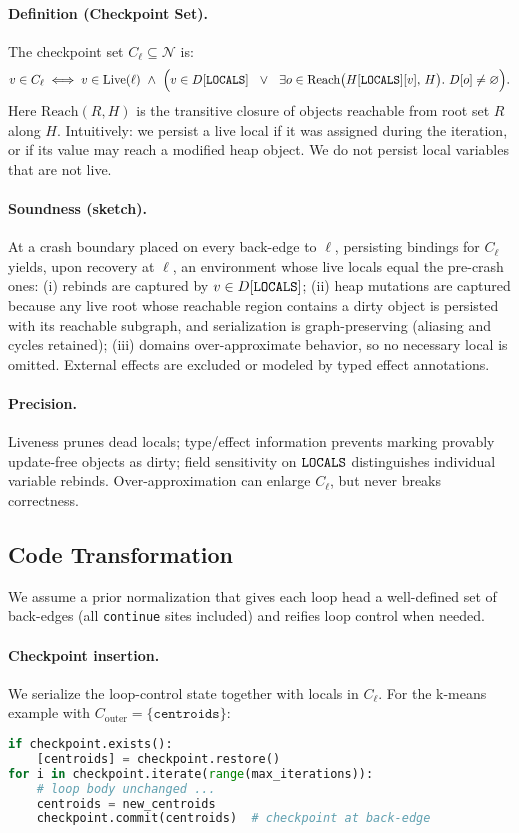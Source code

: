 \paragraph{Definition (Checkpoint Set).}
The checkpoint set $C_\ell\subseteq\mathcal{N}$ is:
\[
v\in C_\ell \iff v\in \text{Live}(\ell)\ \wedge\
\Big( v\in D[\texttt{LOCALS}] \ \ \lor\ \ \exists o\in \text{Reach}\big(H[\texttt{LOCALS}][v],\,H\big).\ D[o]\neq\varnothing \Big).
\]
Here $\text{Reach}(R,H)$ is the transitive closure of objects reachable from root set $R$ along $H$.
Intuitively: we persist a live local if it was assigned during the iteration, or if its value may reach a modified heap object. We do not persist local variables that are not live.

\paragraph{Soundness (sketch).}
At a crash boundary placed on every back-edge to $\ell$, persisting bindings for $C_\ell$ yields, upon recovery at $\ell$, an environment whose live locals equal the pre-crash ones:
(i) rebinds are captured by $v\in D[\texttt{LOCALS}]$; (ii) heap mutations are captured because any live root whose reachable region contains a dirty object is persisted with its reachable subgraph, and serialization is graph-preserving (aliasing and cycles retained); (iii) domains over-approximate behavior, so no necessary local is omitted. External effects are excluded or modeled by typed effect annotations.

\paragraph{Precision.}
Liveness prunes dead locals; type/effect information prevents marking provably update-free objects as dirty; field sensitivity on $\texttt{LOCALS}$ distinguishes individual variable rebinds. Over-approximation can enlarge $C_\ell$, but never breaks correctness.

\subsection{Code Transformation}

We assume a prior normalization that gives each loop head a well-defined set of back-edges (all \texttt{continue} sites included) and reifies loop control when needed.

\paragraph{Checkpoint insertion.}
We serialize the loop-control state together with locals in $C_\ell$. For the k-means example with $C_\text{outer} = \{\texttt{centroids}\}$:
\begin{lstlisting}[language=Python]
if checkpoint.exists():
    [centroids] = checkpoint.restore()
for i in checkpoint.iterate(range(max_iterations)):
    # loop body unchanged ...
    centroids = new_centroids
    checkpoint.commit(centroids)  # checkpoint at back-edge
\end{lstlisting}

